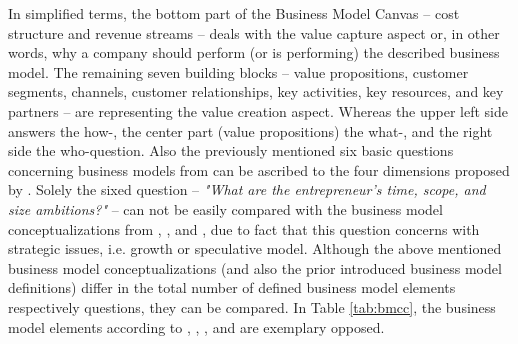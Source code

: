 In simplified terms, the bottom part of the Business Model Canvas -- cost structure and revenue streams -- deals with the value capture aspect or, in other words, why a company should perform (or is performing) the described business model. The remaining seven building blocks -- value propositions, customer segments, channels, customer relationships, key activities, key resources, and key partners -- are representing the value creation aspect. Whereas the upper left side answers the how-, the center part (value propositions) the what-, and the right side the who-question. Also the previously mentioned six basic questions concerning business models from \citet[pp. 729-732]{Morris2005} can be ascribed to the four dimensions proposed by \citet{Frankenberger2013}. Solely the sixed question -- \textit{"What are the entrepreneur's time, scope, and size ambitions?"} -- can not be easily compared with the business model conceptualizations from \citet{Johnson2008}, \citet{Osterwalder2010}, and \citet{Frankenberger2013}, due to fact that this question concerns with strategic issues, i.e. growth or speculative model. Although the above mentioned business model conceptualizations (and also the prior introduced business model definitions) differ in the total number of defined business model elements respectively questions, they can be compared. In Table \ref{tab:bmcc}, the business model elements according to \citet{Johnson2008}, \citet{Osterwalder2010}, \citet{Morris2005}, and \citet{Frankenberger2013} are exemplary opposed.


